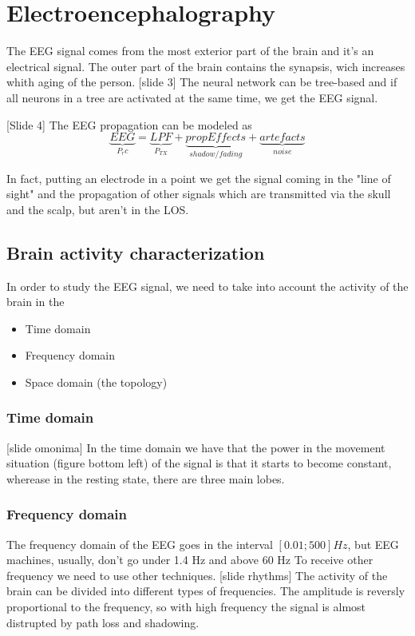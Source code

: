 \chapter{Electroencephalography}
The EEG signal comes from the most exterior part of the brain and it's an electrical signal. The outer part of the brain contains the synapsis, wich increases whith aging of the person.
[slide 3]
The neural network can be tree-based and if all neurons in a tree are activated at the same time, we get the EEG signal.

[Slide 4]
The EEG propagation can be modeled as
\begin{equation}
  \underbrace{EEG}_{P_rc}= \underbrace{LPF}_{P_{TX}} + \underbrace{propEffects}_{shadow/fading} + \underbrace{artefacts}_{noise}
\end{equation}

In fact, putting an electrode in a point we get the signal coming in the "line of sight" and the propagation of other signals which are transmitted via the skull and the scalp, but aren't in the LOS.

\section{Brain activity characterization}
In order to study the EEG signal, we need to take into account the activity of the brain in the \begin{itemize}
  \item Time domain
  \item Frequency domain
  \item Space domain (the topology)
\end{itemize}
\subsection{Time domain}
[slide omonima]
In the time domain we have that the power in the movement situation (figure bottom left) of the signal is that it starts to become constant, wherease in the resting state, there are three main lobes.

\subsection{Frequency domain}
The frequency domain of the EEG goes in the interval $[0.01;500] Hz$, but EEG machines, usually, don't go under 1.4 Hz and above 60 Hz
To receive other frequency we need to use other techniques.
[slide rhythms]
The activity of the brain can be divided into different types of frequencies. The amplitude is reversly proportional to the frequency, so with high frequency the signal is almost distrupted by path loss and shadowing.

